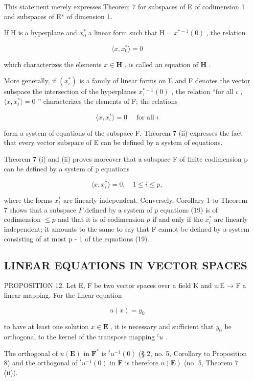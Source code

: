 This statement merely expresses Theorem 7 for subspaces of E of codimension 1 and subspaces of E* of dimension 1.

If H is a hyperplane and \(x_{0}^{*}\) a linear form such that \(\mathrm{H}=x^{*-1}(0)\) , the relation

\[
\langle x, x _ {0} ^ {*} \rangle = 0
\]

which characterizes the elements \(x \in \mathbf{H}\) , is called an equation of \(\mathbf{H}\) .

More generally, if \((x_{\iota}^{*})\) is a family of linear forms on E and F denotes the vector subspace the intersection of the hyperplanes \(x_{\iota}^{*-1}(0)\) , the relation ``for all \(\iota\) , \(\langle x, x_{\iota}^{*}\rangle = 0\) '' characterizes the elements of F; the relations

\[
\langle x, x _ {\iota} ^ {*} \rangle = 0 \quad \text { for   all } \iota
\]

form a system of equations of the subspace F. Theorem 7 (ii) expresses the fact that every vector subspace of E can be defined by a system of equations.

Theorem 7 (i) and (ii) proves moreover that a subspace F of finite codimension p can be defined by a system of p equations

\[
\langle x, x _ {i} ^ {*} \rangle = 0, \quad 1 \leqslant i \leqslant p,\tag{19}
\]

where the forms \(x_{i}^{*}\) are linearly independent. Conversely, Corollary 1 to Theorem 7 shows that a subspace \(F\) defined by a system of \(p\) equations (19) is of codimension \(\leqslant p\) and that it is of codimension \(p\) if and only if the \(x_{i}^{*}\) are linearly independent; it amounts to the same to say that F cannot be defined by a system consisting of at most p - 1 of the equations (19).

\subsection{LINEAR EQUATIONS IN VECTOR SPACES}

PROPOSITION 12. Let E, F be two vector spaces over a field K and u:E → F a linear mapping. For the linear equation

\[
u (x) = y _ {0}\tag{20}
\]

to have at least one solution \(x \in \mathbf{E}\) , it is necessary and sufficient that \(y_0\) be orthogonal to the kernel of the transpose mapping \(^t u\) .

The orthogonal of \(u(\mathbf{E})\) in \(\mathbf{F}^*\) is \({}^t u^{-1}(0)\) (§ 2, no. 5, Corollary to Proposition 8) and the orthogonal of \({}^t u^{-1}(0)\) in \(\mathbf{F}\) is therefore \(u(\mathbf{E})\) (no. 5, Theorem 7 (ii)).

